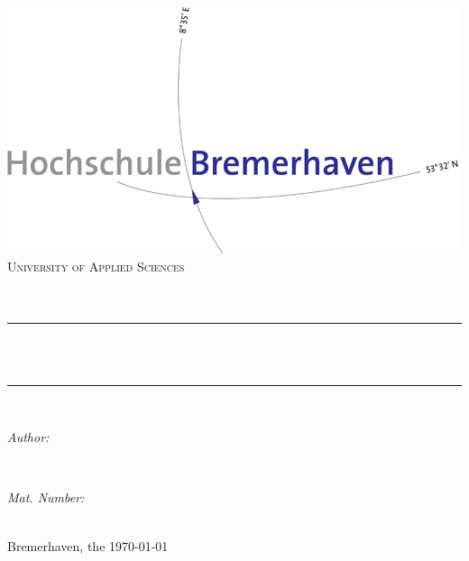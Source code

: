 \begin{titlepage} %
	\centering %
    
    \includegraphics[scale = 0.4]{images/hs-logo.png}\\[1.5 cm]	%
    \textsc{\LARGE University of Applied Sciences}\\[2.0 cm]%
	\textsc{\Large \sFaculty}\\[0.5 cm]				%
	\textsc{\large \sFirstTutor}\\[0.5 cm] %
    	
	\rule{\linewidth}{0.2 mm} \\[0.4 cm] %
	{ \huge \bfseries {\sTitle}}\\
	\rule{\linewidth}{0.2 mm} \\[1.5 cm] %
	
	\begin{minipage}{0.5\textwidth} %
		\begin{center} \large %
			\emph{Author:}\\
			\sName
			\end{center}
			\end{minipage}~
			\begin{minipage}{0.5\textwidth}
			\begin{center} \large %
			\emph{Mat. Number:} \\
            \sMtrNr								
		\end{center}
	\end{minipage}\\[1.5 cm] %
	
	{ \large Bremerhaven, the \today} %
    
\end{titlepage}